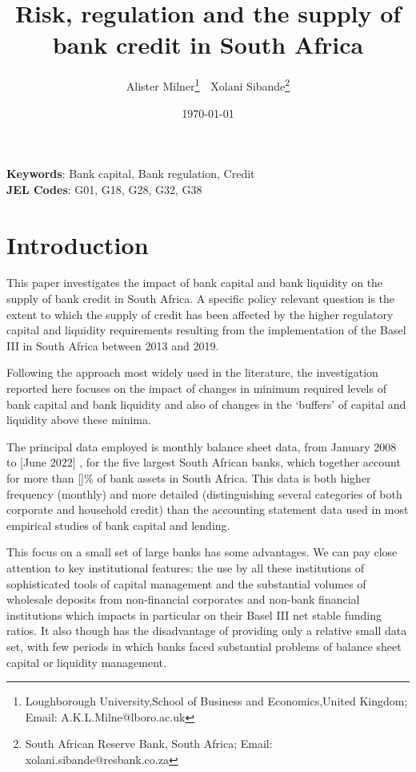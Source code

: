 \documentclass[
]{article}
\author{}
\date{\vspace{-2.5em}}
\begin{document}
\title{Risk, regulation and the supply of bank credit in South Africa}


\author { 
Alister Milner\footnote{Loughborough University,School of Business and Economics,United Kingdom; Email: A.K.L.Milne@lboro.ac.uk}  \,\, 
Xolani Sibande\footnote{South African Reserve Bank, South Africa; Email: xolani.sibande@resbank.co.za}
}
\date{\today}
\maketitle

\begin{abstract}


\end{abstract}

\noindent\textbf{Keywords}: Bank capital, Bank regulation, Credit   \\
\textbf{JEL Codes}: G01, G18, G28, G32, G38
\newpage

\hypertarget{introduction}{%
\section{Introduction}\label{introduction}}

This paper investigates the impact of bank capital and bank liquidity on the supply of bank credit in South Africa. A specific policy relevant question is the extent to which the supply of credit has been affected by the higher regulatory capital and liquidity requirements resulting from the implementation of the Basel III in South Africa between 2013 and 2019.

Following the approach most widely used in the literature, the investigation reported here focuses on the impact of changes in minimum required levels of bank capital and bank liquidity and also of changes in the `buffers' of capital and liquidity above these minima.

The principal data employed is monthly balance sheet data, from January 2008 to {[}June 2022{]} , for the five largest South African banks, which together account for more than {[}{]}\% of bank assets in South Africa. This data is both higher frequency (monthly) and more detailed (distinguishing several categories of both corporate and household credit) than the accounting statement data used in most empirical studies of bank capital and lending.

This focus on a small set of large banks has some advantages. We can pay close attention to key institutional features: the use by all these institutions of sophisticated tools of capital management and the substantial volumes of wholesale deposits from non-financial corporates and non-bank financial institutions which impacts in particular on their Basel III net stable funding ratios. It also though has the disadvantage of providing only a relative small data set, with few periods in which banks faced substantial problems of balance sheet capital or liquidity management.
\end{document}
